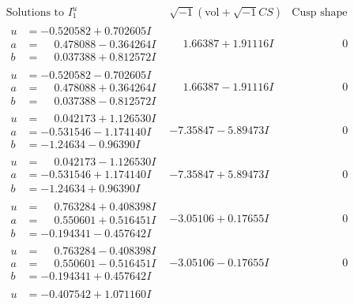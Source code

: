\documentclass[1p]{elsarticle_modified}
\theoremstyle{definition}
\newcommand{\I}{\sqrt{-1}}
\begin{document}
$$\begin{array}{c|c|c}
\text{Solutions to }I^u_{1}& \I (\text{vol} + \sqrt{-1}CS) & \text{Cusp shape}\\
 \hline 
\begin{aligned}
u &= -0.520582 + 0.702605 I \\
a &= \phantom{-}0.478088 - 0.364264 I \\
b &= \phantom{-}0.037388 + 0.812572 I\end{aligned}
 & \phantom{-}1.66387 + 1.91116 I & \phantom{-0.000000 } 0 \\ \hline\begin{aligned}
u &= -0.520582 - 0.702605 I \\
a &= \phantom{-}0.478088 + 0.364264 I \\
b &= \phantom{-}0.037388 - 0.812572 I\end{aligned}
 & \phantom{-}1.66387 - 1.91116 I & \phantom{-0.000000 } 0 \\ \hline\begin{aligned}
u &= \phantom{-}0.042173 + 1.126530 I \\
a &= -0.531546 - 1.174140 I \\
b &= -1.24634 - 0.96390 I\end{aligned}
 & -7.35847 - 5.89473 I & \phantom{-0.000000 } 0 \\ \hline\begin{aligned}
u &= \phantom{-}0.042173 - 1.126530 I \\
a &= -0.531546 + 1.174140 I \\
b &= -1.24634 + 0.96390 I\end{aligned}
 & -7.35847 + 5.89473 I & \phantom{-0.000000 } 0 \\ \hline\begin{aligned}
u &= \phantom{-}0.763284 + 0.408398 I \\
a &= \phantom{-}0.550601 + 0.516451 I \\
b &= -0.194341 - 0.457642 I\end{aligned}
 & -3.05106 + 0.17655 I & \phantom{-0.000000 } 0 \\ \hline\begin{aligned}
u &= \phantom{-}0.763284 - 0.408398 I \\
a &= \phantom{-}0.550601 - 0.516451 I \\
b &= -0.194341 + 0.457642 I\end{aligned}
 & -3.05106 - 0.17655 I & \phantom{-0.000000 } 0 \\ \hline\begin{aligned}
u &= -0.407542 + 1.071160 I \\

\end{aligned}
\end{array}$$
\end{document}
